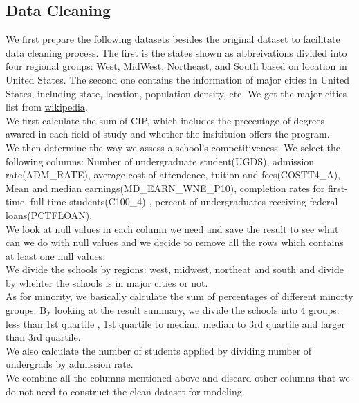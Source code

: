\documentclass{article}
\begin{document}
\subsection{Data Cleaning}

We first prepare the following datasets besides the original dataset to facilitate data cleaning process. The first is the states shown as abbreivations divided into four regional groups: West, MidWest, Northeast, and South based on location in United States. The second one contains the information of major cities in United States, including state, location, population density, etc. We get the major cities list from \href{https://en.wikipedia.org/wiki/List_of_United_States_cities_by_population}{wikipedia}.\\

We first calculate the sum of CIP, which includes the precentage of degrees awared in each field of study and whether the insitituion offers the program.\\

We then determine the way we assess a school's competitiveness. We select the following columns: Number of undergraduate student(UGDS), admission rate(ADM\_RATE), average cost of attendence, tuition and fees(COSTT4\_A), Mean and median earnings(MD\_EARN\_WNE\_P10), completion rates for first-time, full-time students(C100\_4) , percent of undergraduates receiving federal loans(PCTFLOAN).\\

We look at null values in each column we need and save the result to see what can we do with null values and we decide to remove all the rows which contains at least one null values.\\

We divide the schools by regions: west, midwest, northeat and south and divide by whehter the schools is in major cities or not.\\

As for minority, we basically calculate the sum of percentages of different minorty groups. By looking at the result summary, we divide the schools into 4 groups: less than 1st quartile , 1st quartile to median, median to 3rd quartile and larger than 3rd quartile.\\

We also calculate the number of students applied by dividing number of undergrads by admission rate.\\

We combine all the columns mentioned above and discard other columns that we do not need to construct the clean dataset for modeling.\\
\end{document}
